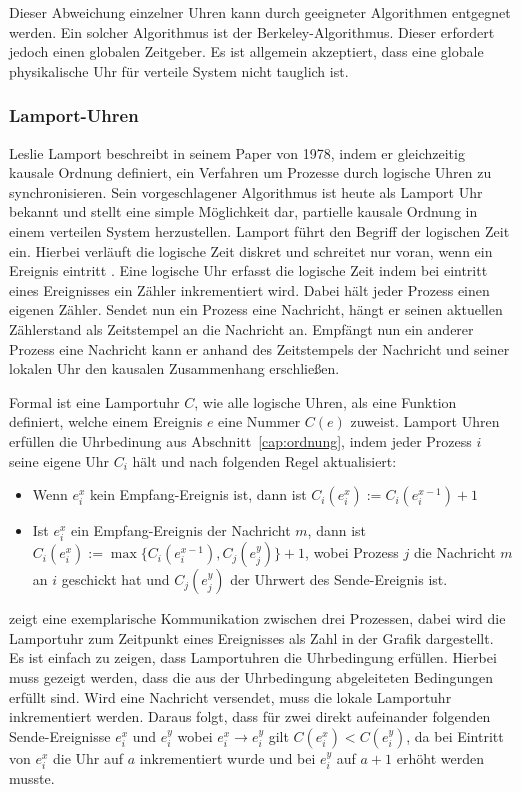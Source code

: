 Dieser Abweichung einzelner Uhren kann durch geeigneter Algorithmen entgegnet werden.
Ein solcher Algorithmus ist der Berkeley-Algorithmus. Dieser erfordert jedoch einen globalen Zeitgeber.
Es ist allgemein akzeptiert, dass eine globale physikalische Uhr für verteile System nicht tauglich ist. %

\subsubsection{Lamport-Uhren}
\label{cap:vectorclock}
Leslie Lamport beschreibt in seinem Paper \cite{Lamport1978} von 1978, indem er gleichzeitig kausale Ordnung definiert, ein Verfahren um Prozesse durch logische Uhren zu synchronisieren.
Sein vorgeschlagener Algorithmus ist heute als Lamport Uhr bekannt und stellt eine simple Möglichkeit dar, partielle kausale Ordnung in einem verteilen System herzustellen.
Lamport führt den Begriff der logischen Zeit ein.
Hierbei verläuft die logische Zeit diskret und schreitet nur voran, wenn ein Ereignis eintritt \cite{leon2013ereignisdiskrete}.
Eine logische Uhr erfasst die logische Zeit indem bei eintritt eines Ereignisses ein Zähler inkrementiert wird.
Dabei hält jeder Prozess einen eigenen Zähler.
Sendet nun ein Prozess eine Nachricht, hängt er seinen aktuellen Zählerstand als Zeitstempel an die Nachricht an.
Empfängt nun ein anderer Prozess eine Nachricht kann er anhand des Zeitstempels der Nachricht und seiner lokalen Uhr den kausalen Zusammenhang erschließen.

Formal ist eine Lamportuhr $C$, wie alle logische Uhren, als eine Funktion definiert, welche einem Ereignis $e$ eine Nummer $C(e)$ zuweist.
Lamport Uhren erfüllen die Uhrbedinung aus Abschnitt~\ref{cap:ordnung}, indem jeder Prozess $i$ seine eigene Uhr $C_i$ hält und nach folgenden Regel aktualisiert:
\begin{itemize}
    \item Wenn $e_i^x$ kein Empfang-Ereignis ist, dann ist $C_i(e_i^x):=C_i(e_i^{x-1})+1$
    \item Ist $e_i^x$ ein Empfang-Ereignis der Nachricht $m$, dann ist $C_i(e_i^x):=\max\{C_i(e_i^{x-1}), C_j(e_j^y)  \} + 1$, wobei Prozess $j$ die Nachricht $m$ an $i$ geschickt hat und $C_j(e_j^y)$ der Uhrwert des Sende-Ereignis ist.
\end{itemize}

 zeigt eine exemplarische Kommunikation zwischen drei Prozessen, dabei wird die Lamportuhr zum Zeitpunkt eines Ereignisses als Zahl in der Grafik dargestellt.
Es ist einfach zu zeigen, dass Lamportuhren die Uhrbedingung erfüllen.
Hierbei muss gezeigt werden, dass die aus der Uhrbedingung abgeleiteten Bedingungen erfüllt sind.
Wird eine Nachricht versendet, muss die lokale Lamportuhr inkrementiert werden. 
Daraus folgt, dass für zwei direkt aufeinander folgenden Sende-Ereignisse $e_i^x$ und $e_i^y$ wobei $e_i^x \rightarrow e_i^y$ gilt $C(e_i^x) < C(e_i^y)$, da bei Eintritt von $e_i^x$ die Uhr auf $a$ inkrementiert wurde und bei $e_i^y$ auf $a + 1$ erhöht werden musste.

